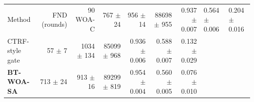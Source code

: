 \begin{tabular}{lrrrrrr}
\toprule
Method & FND (rounds) & 90 %
\midrule
WOA-C & 767 $\pm$ 24 & 956 $\pm$ 14 & 88698 $\pm$ 955 & 0.937 $\pm$ 0.007 & 0.564 $\pm$ 0.006 & 0.204 $\pm$ 0.016 \\
CTRF-style gate & 57 $\pm$ 7 & 1034 $\pm$ 134 & 85099 $\pm$ 968 & 0.936 $\pm$ 0.006 & 0.588 $\pm$ 0.007 & 0.132 $\pm$ 0.029 \\
\textbf{BT-WOA-SA} & 713 $\pm$ 24 & 913 $\pm$ 16 & 89299 $\pm$ 819 & 0.954 $\pm$ 0.004 & 0.560 $\pm$ 0.005 & 0.076 $\pm$ 0.010 \\
\bottomrule
\end{tabular}